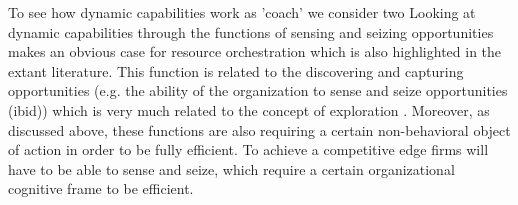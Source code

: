 






To see how dynamic capabilities work as 'coach' we consider two 
Looking at dynamic capabilities through the functions of sensing and seizing opportunities
\cite{Teece2007} makes an obvious case for resource orchestration which is also
highlighted in the extant literature. This function is related to the discovering and
capturing opportunities (e.g. the ability of the organization to sense and seize
opportunities (ibid)) which is very much related to the concept of exploration
\citep{March1991}. Moreover, as discussed above, these functions are also requiring a
certain non-behavioral object of action in order to be fully efficient. To achieve a
competitive edge firms will have to be able to sense and seize, which require a certain
organizational cognitive frame to be efficient. 

